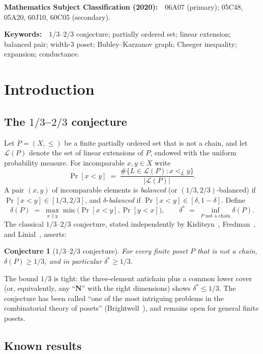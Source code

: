 \documentclass[11pt]{article}
\newtheorem{conjecture}[theorem]{Conjecture}
\theoremstyle{definition}
\theoremstyle{remark}
\newcommand{\LP}{\mathcal{L}(P)}
\begin{document}
\begin{center}
\textbf{Mathematics Subject Classification (2020):}\ \ 06A07 (primary);
05C48, 05A20, 60J10, 60C05 (secondary).

\smallskip
\textbf{Keywords:}\ \ $1/3$--$2/3$ conjecture; partially ordered set;
linear extension; balanced pair; width-$3$ poset; Bubley--Karzanov
graph; Cheeger inequality; expansion; conductance.
\end{center}

\tableofcontents

\section{Introduction}
\label{sec:intro}

\subsection{The $1/3$--$2/3$ conjecture}

Let $P=(X,\le)$ be a finite partially ordered set that is not a chain,
and let $\LP$ denote the set of linear extensions of $P$, endowed with
the uniform probability measure.  For incomparable $x,y\in X$ write
\[
  \Pr[x<y] \;=\; \frac{\#\{L\in\LP : x<_L y\}}{|\LP|}.
\]
A pair $(x,y)$ of incomparable elements is \emph{balanced} (or
$(1/3,2/3)$-balanced) if $\Pr[x<y]\in[1/3,2/3]$, and
$\delta$-\emph{balanced} if $\Pr[x<y]\in[\delta,1-\delta]$.  Define
\[
  \delta(P) \;=\; \max_{x\parallel y} \min\bigl(\Pr[x<y],\Pr[y<x]\bigr),
  \qquad
  \delta^* \;=\; \inf_{P\text{ not a chain}} \delta(P).
\]
The classical $1/3$--$2/3$ conjecture, stated independently by
Kislitsyn~\cite{Kislitsyn1968}, Fredman~\cite{Fredman1976}, and
Linial~\cite{Linial1984}, asserts:

\begin{conjecture}[$1/3$--$2/3$ conjecture]
\label{conj:main}
For every finite poset $P$ that is not a chain, $\delta(P)\ge 1/3$,
and in particular $\delta^*\ge 1/3$.
\end{conjecture}

The bound $1/3$ is tight: the three-element antichain plus a common
lower cover (or, equivalently, any ``$\mathbf{N}$'' with the right
dimensions) shows $\delta^*\le 1/3$.  The conjecture has been called
``one of the most intriguing problems in the combinatorial theory of
posets'' (Brightwell~\cite{Brightwell1999}), and remains open for
general finite posets.

\subsection{Known results}
\label{sec:intro-known}
\end{document}
